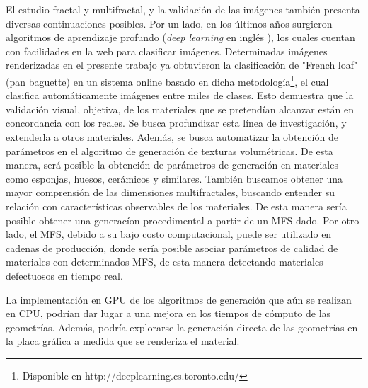 El estudio fractal y multifractal, y la validación de las imágenes también presenta diversas continuaciones posibles.
Por un lado, en los últimos años surgieron algoritmos de aprendizaje profundo ({\em deep learning} en inglés \cite{Kiros2014}), los cuales cuentan con facilidades en la web para clasificar imágenes.
Determinadas imágenes renderizadas en el presente trabajo ya obtuvieron la clasificación de "French loaf" (pan baguette) en un sistema online basado en dicha metodología\footnote{Disponible en http://deeplearning.cs.toronto.edu/}, el cual clasifica automáticamente imágenes entre miles de clases.
Esto demuestra que la validación visual, objetiva, de los materiales que se pretendían alcanzar están en concordancia con los reales.
Se busca profundizar esta línea de investigación, y extenderla a otros materiales.
Además, se busca automatizar la obtención de parámetros en el algoritmo de generación de texturas volumétricas.
De esta manera, será posible la obtención de parámetros de generación en materiales como esponjas, huesos, cerámicos y similares.
También buscamos obtener una mayor comprensión de las dimensiones multifractales, buscando entender su relación con características observables de los materiales.
De esta manera sería posible obtener una generacíon procedimental a partir de un MFS dado.
Por otro lado, el MFS, debido a su bajo costo computacional,  puede ser utilizado en cadenas de producción, donde sería posible asociar parámetros de calidad de materiales con determinados MFS, de esta manera detectando materiales defectuosos en tiempo real.

La implementación en GPU de los algoritmos de generación que aún se realizan en CPU, podrían dar lugar a una mejora en los tiempos de cómputo de las geometrías.
Además, podría explorarse la generación directa de las geometrías en la placa gráfica a medida que se renderiza el material.

